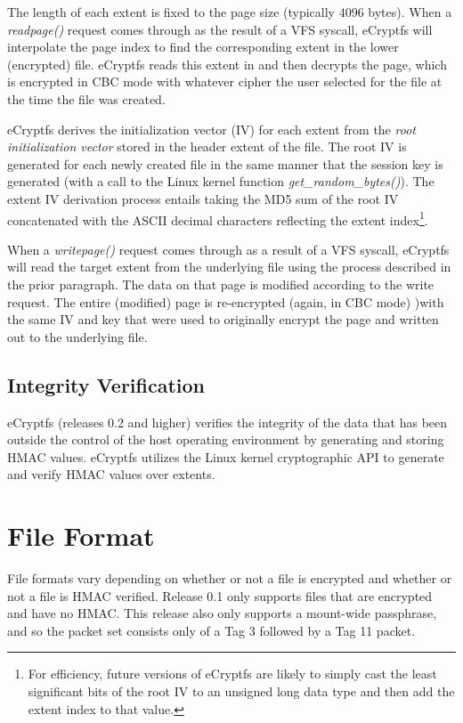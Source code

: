 \documentclass{article}
\begin{document}
The length of each extent is fixed to the page size (typically $4096$
bytes). When a \emph{readpage()} request comes through as the result
of a VFS syscall, eCryptfs will interpolate the page index to find the
corresponding extent in the lower (encrypted) file. eCryptfs reads
this extent in and then decrypts the page, which is encrypted in CBC
mode with whatever cipher the user selected for the file at the time
the file was created.

eCryptfs derives the initialization vector (IV) for each extent from
the \emph{root initialization vector} stored in the header extent of
the file. The root IV is generated for each newly created file in the
same manner that the session key is generated (with a call to the
Linux kernel function \emph{get\_random\_bytes()}). The extent IV
derivation process entails taking the MD5 sum of the root IV
concatenated with the ASCII decimal characters reflecting the extent
index\footnote{For efficiency, future versions of eCryptfs are likely
to simply cast the least significant bits of the root IV to an
unsigned long data type and then add the extent index to that value.}.

When a \emph{writepage()} request comes through as a result of a VFS
syscall, eCryptfs will read the target extent from the underlying file
using the process described in the prior paragraph. The data on that
page is modified according to the write request. The entire (modified)
page is re-encrypted (again, in CBC mode) )with the same IV and key that
were used to originally encrypt the page and written out to the
underlying file.

\subsection*{Integrity Verification}

eCryptfs (releases 0.2 and higher) verifies the integrity of the data
that has been outside the control of the host operating environment by
generating and storing HMAC values. eCryptfs utilizes the Linux kernel
cryptographic API to generate and verify HMAC values over extents.

\section*{File Format}

File formats vary depending on whether or not a file is encrypted and
whether or not a file is HMAC verified. Release 0.1 only supports
files that are encrypted and have no HMAC. This release also only
supports a mount-wide passphrase, and so the packet set consists only
of a Tag 3 followed by a Tag 11 packet.
\end{document}
